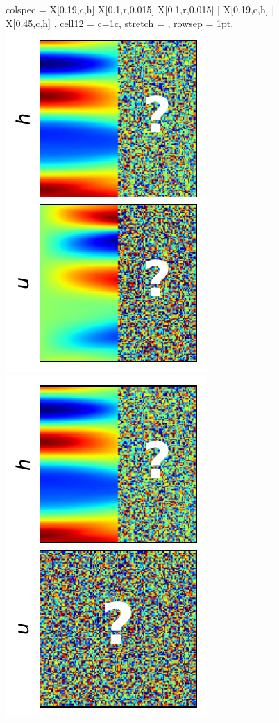 \documentclass{article}
\begin{document}
\begin{figure}[t]
\begin{tblr}{
  colspec = {X[0.19,c,h] X[0.1,r,0.015] X[0.1,r,0.015] | X[0.19,c,h] | X[0.45,c,h] },
  cell{1}{2} = {c=1}{c}, %
  stretch = ,
  rowsep = 1pt,
}
     \hspace{1mm}
     \includegraphics[height=\myheight,trim={8mm 2mm 2mm 2mm},clip]{img/diff_cases/case3_inf.pdf}
     \hspace{1mm}
     \includegraphics[height=\myheight,trim={8mm 2mm 2mm 2mm},clip]{img/diff_cases/case4_inf.pdf}

\end{tblr}
\end{figure}
\end{document}

